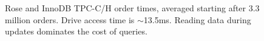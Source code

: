 \documentclass{vldb}
\newcommand{\rows}{Rose\xspace}
\newcommand{\rowss}{Rose's\xspace}
\begin{document}
%



\begin{figure}
\centering {}
\caption{\rows and InnoDB TPC-C/H order times, averaged starting after
  3.3 million orders.  Drive access time is $\sim$13.5ms.  Reading
  data during updates dominates the cost of queries.}
\label{fig:tpch-innodb}
\end{figure}



\end{document}
